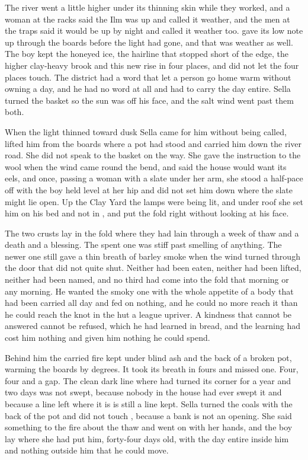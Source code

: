 The river went a little higher under its thinning skin while they worked, and a woman at the racks said the Ilm was up and called it weather, and the men at the traps said it would be up by night and called it weather too.  gave its low note up through the boards before the light had gone, and that was weather as well. The boy kept the honeyed ice, the hairline that stopped short of the edge, the higher clay-heavy brook and this new rise in four places, and did not let the four places touch. The district had a word that let a person go home warm without owning a day, and he had no word at all and had to carry the day entire. Sella turned the basket so the sun was off his face, and the salt wind went past them both.

When the light thinned toward dusk Sella came for him without being called, lifted him from the boards where a pot had stood and carried him down the river road. She did not speak to the basket on the way. She gave the instruction to the wool when the wind came round the bend, and said the house would want its eels, and once, passing a woman with a slate under her arm, she stood a half-pace off with the boy held level at her hip and did not set him down where the slate might lie open. Up the Clay Yard the lamps were being lit, and under  roof she set him on his bed and not in , and put the fold right without looking at his face.

The two crusts lay in the fold where they had lain through a week of thaw and a death and a blessing. The spent one was stiff past smelling of anything. The newer one still gave a thin breath of barley smoke when the wind turned through the door that did not quite shut. Neither had been eaten, neither had been lifted, neither had been named, and no third had come into the fold that morning or any morning. He wanted the smoky one with the whole appetite of a body that had been carried all day and fed on nothing, and he could no more reach it than he could reach the knot in the hut a league upriver. A kindness that cannot be answered cannot be refused, which he had learned in bread, and the learning had cost him nothing and given him nothing he could spend.

Behind him the carried fire kept under blind ash and the back of a broken pot, warming the boards by degrees. It took its breath in fours and missed one. Four, four and a gap. The clean dark line where  had turned its corner for a year and two days was not swept, because nobody in the house had ever swept it and because a line left where it is is still a line kept. Sella turned the coals with the back of the pot and did not touch , because a bank is not an opening. She said something to the fire about the thaw and went on with her hands, and the boy lay where she had put him, forty-four days old, with the day entire inside him and nothing outside him that he could move.

